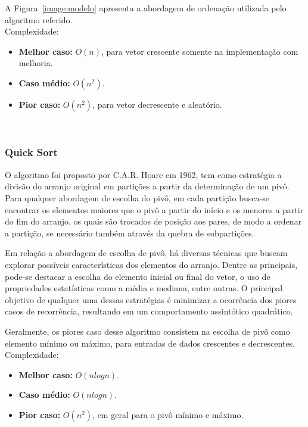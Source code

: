 \documentclass[conference]{IEEEtran}
\begin{document}
A Figura~\ref{image:modelo} apresenta a abordagem de ordenação utilizada pelo algoritmo referido.\\

Complexidade:
\begin{itemize}
\item \textbf{Melhor caso:} $O (n)$, para vetor crescente somente na implementação com melhoria.
\item \textbf{Caso médio:} $O (n^2)$.
\item \textbf{Pior caso:} $O (n^2)$, para vetor decrescente e aleatório.
\end{itemize}

~\\
\subsubsection{Quick Sort}

O algoritmo foi proposto por C.A.R. Hoare em 1962, tem como estratégia a divisão do arranjo original em partições a partir da determinação de um pivô. Para qualquer abordagem de escolha do pivô, em cada partição busca-se encontrar os elementos maiores que o pivô a partir do início e os menores a partir do fim do arranjo, os quais são trocados de posição aos pares, de modo a ordenar a partição, se necessário também através da quebra de subpartições.

Em relação a abordagem de escolha de pivô, há diversas técnicas que buscam explorar possíveis características dos elementos do arranjo. Dentre as principais, pode-se destacar a escolha do elemento inicial ou final do vetor, o uso de propriedades estatísticas como a média e mediana, entre outras. O principal objetivo de qualquer uma dessas estratégias é minimizar a ocorrência dos piores casos de recorrência, resultando em um comportamento assintótico quadrático.

Geralmente, os piores caso desse algoritmo consistem na escolha de pivô como elemento mínimo ou máximo, para entradas de dados crescentes e decrescentes.\\

Complexidade:
\begin{itemize}
\item \textbf{Melhor caso:} $O (nlog n)$.
\item \textbf{Caso médio:} $O (nlog n)$.
\item \textbf{Pior caso:} $O (n^2)$, em geral para o pivô mínimo e máximo.
\end{itemize}
\end{document}
